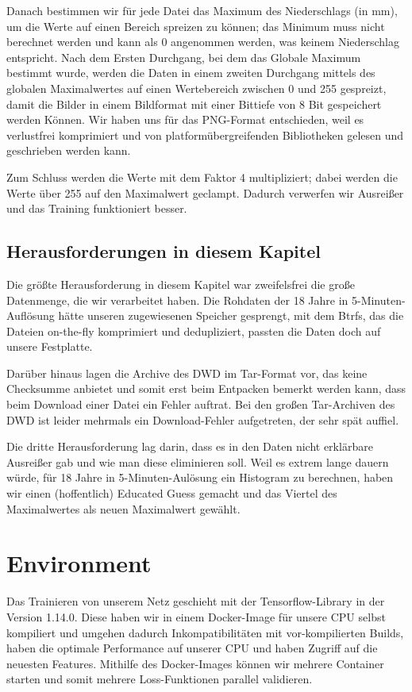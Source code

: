 \documentclass[11pt]{article}
\begin{document}
Danach bestimmen wir für jede Datei das Maximum des Niederschlags (in mm), um die Werte auf einen Bereich spreizen zu können; das Minimum muss nicht berechnet werden und kann als 0 angenommen werden, was keinem Niederschlag entspricht.
Nach dem Ersten Durchgang, bei dem das Globale Maximum bestimmt wurde, werden die Daten in einem zweiten Durchgang mittels  des globalen Maximalwertes auf einen Wertebereich zwischen 0 und 255 gespreizt, damit die Bilder in einem Bildformat mit einer Bittiefe von 8 Bit gespeichert werden Können. Wir haben uns für das PNG-Format entschieden, weil es verlustfrei komprimiert und von platformübergreifenden Bibliotheken gelesen und geschrieben werden kann.

Zum Schluss werden die Werte mit dem Faktor 4 multipliziert; dabei werden die Werte über 255 auf den Maximalwert geclampt. Dadurch verwerfen wir Ausreißer und das Training funktioniert besser.

\subsection{Herausforderungen in diesem Kapitel}
Die größte Herausforderung in diesem Kapitel war zweifelsfrei die große Datenmenge, die wir verarbeitet haben. Die Rohdaten der 18 Jahre in 5-Minuten-Auflösung hätte unseren zugewiesenen Speicher gesprengt, mit dem Btrfs, das die Dateien on-the-fly komprimiert und dedupliziert, passten die Daten doch auf unsere Festplatte.

Darüber hinaus lagen die Archive des DWD im Tar-Format vor, das keine Checksumme anbietet und somit erst beim Entpacken bemerkt werden kann, dass beim Download einer Datei ein Fehler auftrat. Bei den großen Tar-Archiven des DWD ist leider mehrmals ein Download-Fehler aufgetreten, der sehr spät auffiel.

Die dritte Herausforderung lag darin, dass es in den Daten nicht erklärbare Ausreißer gab und wie man diese eliminieren soll. Weil es extrem lange dauern würde, für 18 Jahre in 5-Minuten-Aulösung ein Histogram zu berechnen, haben wir einen (hoffentlich) Educated Guess gemacht und das Viertel des Maximalwertes als neuen Maximalwert gewählt.


\section{Environment}
Das Trainieren von unserem Netz geschieht mit der Tensorflow-Library in der Version 1.14.0. Diese haben wir in einem Docker-Image für unsere CPU selbst kompiliert und umgehen dadurch Inkompatibilitäten mit vor-kompilierten Builds, haben die optimale Performance auf unserer CPU und haben Zugriff auf die neuesten Features.
Mithilfe des Docker-Images können wir mehrere Container starten und somit mehrere Loss-Funktionen parallel validieren.
\end{document}
